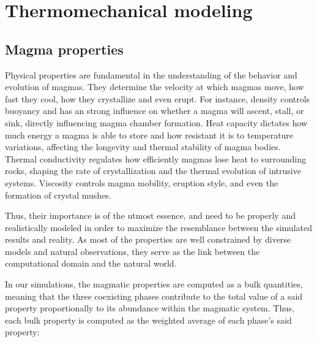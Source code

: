 \begin{table}[H]
	\caption{Material properties for the different phases present in the magma, for the proposed benchamr simulation}
	\label{tab:benchmark_props}
\end{table}


\section{Thermomechanical modeling}
\subsection{Magma properties}
Physical properties are fundamental in the understanding of the behavior and evolution of magmas. They determine the velocity at which magmas move, how fast they cool, how they crystallize and even erupt. For instance, density controls buoyancy and has an strong influence on whether a magma will ascent, stall, or sink, directly influencing magma chamber formation. Heat capacity dictates how much energy a magma is able to store and how resistant it is to temperature variations, affecting the longevity and thermal stability of magma bodies. Thermal conductivity regulates how efficiently magmas lose heat to surrounding rocks, shaping the rate of crystallization and the thermal evolution of intrusive systems. Viscosity controls magma mobility, eruption style, and even the formation of crystal mushes. 

Thus, their importance is of the utmost essence, and need to be properly and realistically modeled in order to maximize the resemblance between the simulated results and reality.  As most of the properties are well constrained by diverse models and natural observations, they serve as the link between the computational domain and the natural world. 

In our simulations, the magmatic properties are computed as a bulk quantities, meaning that the three coexisting phases contribute to the total value of a said property proportionally to its abundance within the magmatic system. Thus, each bulk property is computed as the weighted average of each phase's said property:

